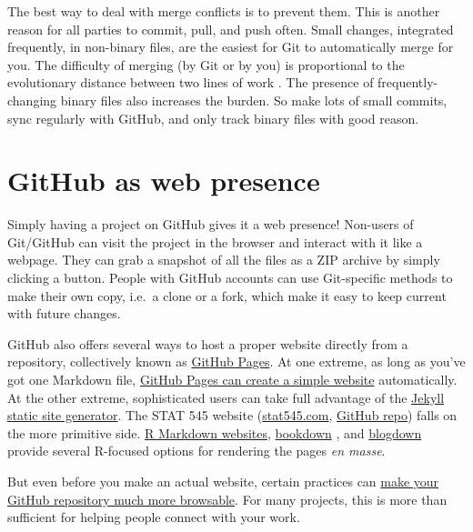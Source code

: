 \documentclass[12pt]{article}
\begin{document}
The best way to deal with merge conflicts is to prevent them. This is
another reason for all parties to commit, pull, and push often. Small
changes, integrated frequently, in non-binary files, are the easiest for
Git to automatically merge for you. The difficulty of merging (by Git or
by you) is proportional to the evolutionary distance between two lines
of work \citep{good-enough}. The presence of frequently-changing binary
files also increases the burden. So make lots of small commits, sync
regularly with GitHub, and only track binary files with good reason.

\section{GitHub as web presence}\label{github-as-web-presence}

Simply having a project on GitHub gives it a web presence! Non-users of
Git/GitHub can visit the project in the browser and interact with it
like a webpage. They can grab a snapshot of all the files as a ZIP
archive by simply clicking a button. People with GitHub accounts can use
Git-specific methods to make their own copy, i.e.~a clone or a fork,
which make it easy to keep current with future changes.

GitHub also offers several ways to host a proper website directly from a
repository, collectively known as
\href{https://help.github.com/categories/github-pages-basics/}{GitHub
Pages}. At one extreme, as long as you've got one Markdown file,
\href{https://github.com/blog/2289-publishing-with-github-pages-now-as-easy-as-1-2-3}{GitHub
Pages can create a simple website} automatically. At the other extreme,
sophisticated users can take full advantage of the
\href{https://jekyllrb.com}{Jekyll static site generator}. The STAT 545
website (\href{http://stat545.com}{stat545.com},
\href{https://github.com/STAT545-UBC/STAT545-UBC.github.io}{GitHub
repo}) falls on the more primitive side.
\href{http://rmarkdown.rstudio.com/rmarkdown_websites.html}{R Markdown
websites}, \href{https://bookdown.org}{bookdown}
\citep{bookdown-pkg, bookdown-book}, and
\href{https://bookdown.org/yihui/blogdown/}{blogdown} provide several
R-focused options for rendering the pages \emph{en masse}.

But even before you make an actual website, certain practices can
\href{http://happygitwithr.com/repo-browsability.html}{make your GitHub
repository much more browsable}. For many projects, this is more than
sufficient for helping people connect with your work.
\end{document}
